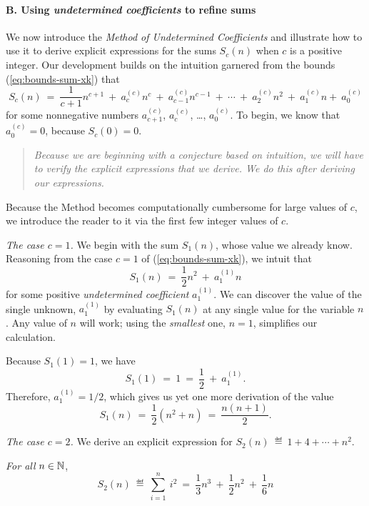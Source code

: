 \medskip

\paragraph{\sf B. Using {\em undetermined coefficients} to refine sums}
We now introduce the {\em Method of Undetermined Coefficients}
and illustrate how to use it to derive explicit expressions for the
sums $S_c(n)$ when $c$ is a positive integer.  Our development builds
on the intuition garnered from the bounds (\ref{eq:bounds-sum-xk})
that
\[ S_c(n) \ = \ \frac{1}{c+1} n^{c+1} \ + \ a^{(c)}_c n^c \ + \
a^{(c)}_{c-1} n^{c-1} \ + \ \cdots \ + \ a^{(c)}_2 n^2 \ + \ a^{(c)}_1 n
 + \ a^{(c)}_0
\]
for some nonnegative numbers  $a^{(c)}_{c+1}$, $a^{(c)}_c$, \ldots,
$a^{(c)}_0$.  To begin, we know that $a^{(c)}_0 = 0$, because $S_c(0)
= 0$.
\begin{quote}
{\em Because we are beginning with a conjecture based on intuition, we
  will have to verify the explicit expressions that we derive.  We do
  this after deriving our expressions.}
\end{quote}

Because the Method becomes computationally cumbersome for large values
of $c$, we introduce the reader to it via the first few integer values
of $c$.

{\it The case $c=1$.}
%
We begin with the sum $S_1(n)$, whose value we already know.
Reasoning from the case $c=1$ of (\ref{eq:bounds-sum-xk}), we intuit
that
\[ S_1(n) \ = \ \frac{1}{2} n^2 \ + \ a^{(1)}_1 n \]
for some positive {\it undetermined coefficient} $a^{(1)}_1$.  We can
discover the value of the single unknown, $a^{(1)}_1$ by evaluating
$S_1(n)$ at any single value for the variable $n$.  Any value of $n$
will work; using the {\em smallest} one, $n=1$, simplifies our
calculation.

Because $S_1(1) = 1$, we have
\[ S_1(1) \ = \ 1 \ = \ \frac{1}{2} \ + \ a^{(1)}_1. \]
Therefore, $a^{(1)}_1 = 1/2$, which gives us yet one more derivation
of the value
\[ S_1(n) \ = \ \frac{1}{2} \left( n^2 + n \right) \ = \ 
\frac{n(n+1)}{2}.
\]

\medskip

{\it The case $c=2$.}
%
We derive an explicit expression for $S_2(n) \ \eqdef \  1 + 4 +
\cdots + n^2$.

\begin{prop}
{\em For all} $n \in \mathbb{N}$,
\begin{equation}
\label{eq:sum-1-to-nsq}
S_2(n) \ \eqdef \ \sum_{i=1}^n \ i^2 
 \ = \ \frac{1}{3} n^3 \ + \ \frac{1}{2} n^2 \ + \ \frac{1}{6} n
\end{equation}
\end{prop}

